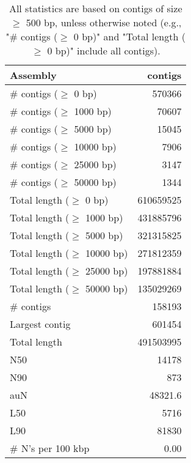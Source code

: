 \documentclass[12pt,a4paper]{article}
\begin{document}
\begin{table}[ht]
\begin{center}
\caption{All statistics are based on contigs of size $\geq$ 500 bp, unless otherwise noted (e.g., "\# contigs ($\geq$ 0 bp)" and "Total length ($\geq$ 0 bp)" include all contigs).}
\begin{tabular}{|l*{1}{|r}|}
\hline
Assembly & contigs \\ \hline
\# contigs ($\geq$ 0 bp) & 570366 \\ \hline
\# contigs ($\geq$ 1000 bp) & 70607 \\ \hline
\# contigs ($\geq$ 5000 bp) & 15045 \\ \hline
\# contigs ($\geq$ 10000 bp) & 7906 \\ \hline
\# contigs ($\geq$ 25000 bp) & 3147 \\ \hline
\# contigs ($\geq$ 50000 bp) & 1344 \\ \hline
Total length ($\geq$ 0 bp) & 610659525 \\ \hline
Total length ($\geq$ 1000 bp) & 431885796 \\ \hline
Total length ($\geq$ 5000 bp) & 321315825 \\ \hline
Total length ($\geq$ 10000 bp) & 271812359 \\ \hline
Total length ($\geq$ 25000 bp) & 197881884 \\ \hline
Total length ($\geq$ 50000 bp) & 135029269 \\ \hline
\# contigs & 158193 \\ \hline
Largest contig & 601454 \\ \hline
Total length & 491503995 \\ \hline
N50 & 14178 \\ \hline
N90 & 873 \\ \hline
auN & 48321.6 \\ \hline
L50 & 5716 \\ \hline
L90 & 81830 \\ \hline
\# N's per 100 kbp & 0.00 \\ \hline
\end{tabular}
\end{center}
\end{table}
\end{document}
